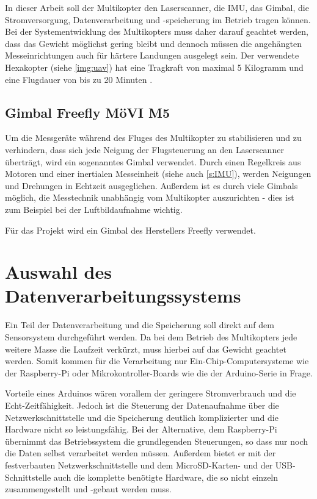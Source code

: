 \documentclass[a4paper,12pt,bibliography=totoc, listof=totoc,titlepage,pointlessnumbers]{scrreprt}
\begin{document}
In dieser Arbeit soll der Multikopter den Laser\-scan\-ner, die IMU, das Gimbal, die Stromversorgung, Datenverarbeitung und -speicherung im Betrieb tragen können. Bei der Systementwicklung des Multikopters muss daher darauf geachtet werden, dass das Gewicht möglichst gering bleibt und dennoch müssen die angehängten Messeinrichtungen auch für härtere Landungen ausgelegt sein. Der verwendete Hexakopter (siehe \autoref{img:uav}) hat eine Tragkraft von maximal 5 Kilogramm und eine Flugdauer von bis zu 20 Minuten \citep{Schulz}.

\subsection{Gimbal Freefly MöVI M5}
Um die Messgeräte während des Fluges des Multikopter zu stabilisieren und zu verhindern, dass sich jede Neigung der Flugsteuerung an den Laser\-scan\-ner überträgt, wird ein sogenanntes Gimbal verwendet. Durch einen Regelkreis aus Motoren und einer inertialen Messeinheit (siehe auch \autoref{s:IMU}), werden Neigungen und Drehungen in Echtzeit ausgeglichen. Außerdem ist es durch viele Gimbals möglich, die Messtechnik unabhängig vom Multikopter auszurichten - dies ist zum Beispiel bei der Luftbildaufnahme wichtig.

Für das Projekt wird ein Gimbal des Herstellers Freefly verwendet. 


\section{Auswahl des Datenverarbeitungssystems}

Ein Teil der Datenverarbeitung und die Speicherung soll direkt auf dem Sensorsystem durchgeführt werden. Da bei dem Betrieb des Multikopters jede weitere Masse die Laufzeit verkürzt, muss hierbei auf das Gewicht geachtet werden. Somit kommen für die Verarbeitung nur Ein-Chip-Computersysteme wie der Raspberry-Pi oder Mikrokontroller-Boards wie die der Arduino-Serie in Frage. 

Vorteile eines Arduinos wären vorallem der geringere Stromverbrauch und die Echt-Zeitfähigkeit. Jedoch ist die Steuerung der Datenaufnahme über die Netzwerkschnittstelle und die Speicherung deutlich komplizierter und die Hardware nicht so leistungsfähig. Bei der Alternative, dem Raspberry-Pi übernimmt das Betriebssystem die grundlegenden Steuerungen, so dass nur noch die Daten selbst verarbeitet werden müssen. Außerdem bietet er mit der festverbauten Netzwerkschnittstelle und dem MicroSD-Karten- und der USB-Schnittstelle auch die komplette benötigte Hardware, die so nicht einzeln zusammengestellt und -gebaut werden muss.
\end{document}
